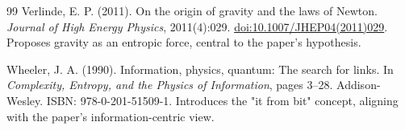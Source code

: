 \documentclass[11pt]{article}
\begin{document}
\begin{thebibliography}{99}
Verlinde, E. P. (2011).
\newblock On the origin of gravity and the laws of Newton.
\newblock \emph{Journal of High Energy Physics}, 2011(4):029.
\newblock \href{https://doi.org/10.1007/JHEP04(2011)029}{doi:10.1007/JHEP04(2011)029}.
\newblock Proposes gravity as an entropic force, central to the paper’s hypothesis.

Wheeler, J. A. (1990).
\newblock Information, physics, quantum: The search for links.
\newblock In \emph{Complexity, Entropy, and the Physics of Information}, pages 3--28. Addison-Wesley.
\newblock ISBN: 978-0-201-51509-1.
\newblock Introduces the "it from bit" concept, aligning with the paper’s information-centric view.

\end{thebibliography}
\end{document}
